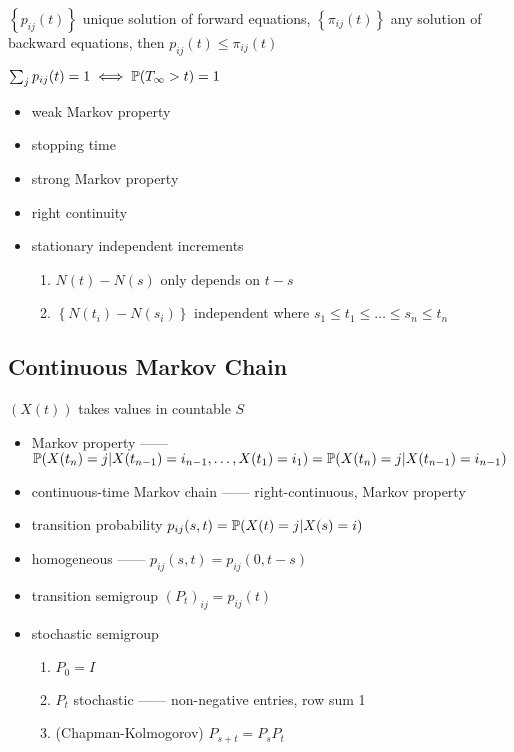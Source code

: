 \begin{thm}
    $\left\{ p_{ij}(t) \right\}$ unique solution of forward equations, $\left\{ \pi_{ij}(t) \right\}$ any solution of backward equations, then
    $p_{ij}(t) \leq \pi_{ij}(t)$
\end{thm}

\begin{fact}
    $\sum_j p_{ij}(t) = 1 \iff \mathbb{P}(T_\infty > t) = 1$
\end{fact}

\begin{itemize}
    \item weak Markov property
    \item stopping time
    \item strong Markov property
    \item right continuity
    \item stationary independent increments
    \begin{enumerate}
        \item $N(t) - N(s)$ only depends on $t - s$
        \item $\left\{ N(t_i) - N(s_i) \right\}$ independent where $s_1 \leq t_1 \leq \dots \leq s_n \leq t_n$
    \end{enumerate}
\end{itemize}

\subsection{Continuous Markov Chain}\label{subsec:continuous-markov-chain}

\begin{setting}
    $(X(t))$ takes values in countable $S$
\end{setting}

\begin{itemize}
    \item Markov property ------ \\$\mathbb{P}(X(t_n) = j|X(t_{n-1}) = i_{n-1}, \dots, X(t_1) = i_1) =\mathbb{P}(X(t_n) = j|X(t_{n-1}) = i_{n-1}) $
    \item continuous-time Markov chain ------ right-continuous, Markov property
    \item transition probability $p_{ij}(s, t) = \mathbb{P}(X(t) = j|X(s) = i)$
    \item homogeneous ------ $p_{ij}(s, t) = p_{ij}(0, t-s)$
    \item transition semigroup $(P_t)_{ij} = p_{ij}(t)$
    \item stochastic semigroup
    \begin{enumerate}
        \item $P_0 = I$
        \item $P_t$ stochastic ------ non-negative entries, row sum 1
        \item (Chapman-Kolmogorov) $P_{s+t} = P_s P_t$
    \end{enumerate}
\end{itemize}

